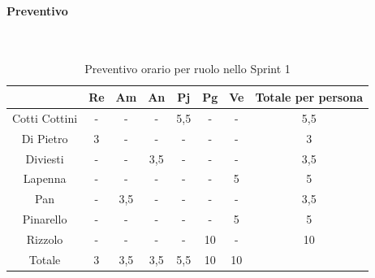 \documentclass{article}
\begin{document}
                \paragraph{Preventivo}\mbox{}\\
                \begin{table}[H]
                    \centering
                    \begin{tabular}{|c|c|c|c|c|c|c|c|}
                    \hline
                                  & Re  & Am  & An  & Pj  & Pg  & Ve  & Totale per persona \\ \hline
                    Cotti Cottini & -   & -   & -   & 5,5 & -   & -   & 5,5                \\ \hline
                    Di Pietro     & 3   & -   & -   & -   & -   & -   & 3                  \\ \hline
                    Diviesti      & -   & -   & 3,5 & -   & -   & -   & 3,5                \\ \hline
                    Lapenna       & -   & -   & -   & -   & -   & 5   & 5                  \\ \hline
                    Pan           & -   & 3,5 & -   & -   & -   & -   & 3,5                \\ \hline
                    Pinarello     & -   & -   & -   & -   & -   & 5   & 5                  \\ \hline
                    Rizzolo       & -   & -   & -   & -   & 10  & -   & 10                 \\ \hline
                    Totale        & 3   & 3,5 & 3,5 & 5,5 & 10  & 10  &                    \\ \hline
                    \end{tabular}
                    \caption{Preventivo orario per ruolo nello Sprint 1}
                \end{table}

\end{document}
